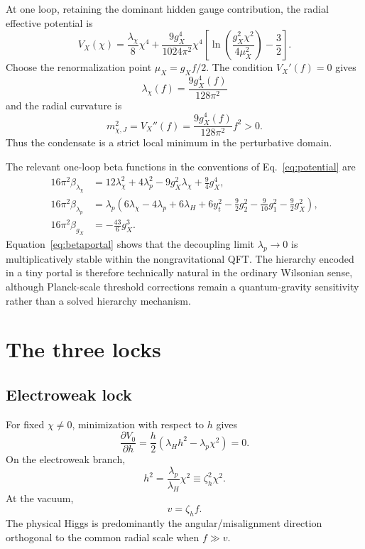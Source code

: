\documentclass[11pt,a4paper]{article}
\begin{document}
At one loop, retaining the dominant hidden gauge contribution, the radial effective potential is
\begin{equation}
V_X(\chi)=\frac{\lambda_\chi}{8}\chi^4
+\frac{9g_X^4}{1024\pi^2}\chi^4
\left[
\ln\left(\frac{g_X^2\chi^2}{4\mu_X^2}\right)-\frac32
\right].
\label{eq:CW}
\end{equation}
Choose the renormalization point $\mu_X=g_Xf/2$. The condition $V_X'(f)=0$ gives
\begin{equation}
\boxed{
\lambda_\chi(f)=\frac{9g_X^4(f)}{128\pi^2}
}
\label{eq:lambdachi}
\end{equation}
and the radial curvature is
\begin{equation}
\boxed{
m_{\chi,J}^2=V_X''(f)=\frac{9g_X^4(f)}{128\pi^2}f^2>0.
}
\label{eq:mchi}
\end{equation}
Thus the condensate is a strict local minimum in the perturbative domain.

The relevant one-loop beta functions in the conventions of Eq.~\eqref{eq:potential} are \cite{CaroneRamos2013}
\begin{align}
16\pi^2\beta_{\lambda_\chi}
&=12\lambda_\chi^2+4\lambda_p^2-9g_X^2\lambda_\chi+\frac94g_X^4,
\label{eq:betalchi}\\
16\pi^2\beta_{\lambda_p}
&=\lambda_p\left(
6\lambda_\chi-4\lambda_p+6\lambda_H+6y_t^2
-\frac92g_2^2-\frac9{10}g_1^2-\frac92g_X^2
\right),
\label{eq:betaportal}\\
16\pi^2\beta_{g_X}&=-\frac{43}{6}g_X^3.
\label{eq:betagx}
\end{align}
Equation~\eqref{eq:betaportal} shows that the decoupling limit $\lambda_p\to0$ is multiplicatively stable within the nongravitational QFT. The hierarchy encoded in a tiny portal is therefore technically natural in the ordinary Wilsonian sense, although Planck-scale threshold corrections remain a quantum-gravity sensitivity rather than a solved hierarchy mechanism.

\section{The three locks}

\subsection{Electroweak lock}

For fixed $\chi\neq0$, minimization with respect to $h$ gives
\[
\frac{\partial V_0}{\partial h}
=\frac{h}{2}\left(\lambda_Hh^2-\lambda_p\chi^2\right)=0.
\]
On the electroweak branch,
\begin{equation}
\boxed{
h^2=\frac{\lambda_p}{\lambda_H}\chi^2
\equiv \zeta_h^2\chi^2.
}
\label{eq:hlock}
\end{equation}
At the vacuum,
\[
v=\zeta_h f.
\]
The physical Higgs is predominantly the angular/misalignment direction orthogonal to the common radial scale when $f\gg v$.
\end{document}
